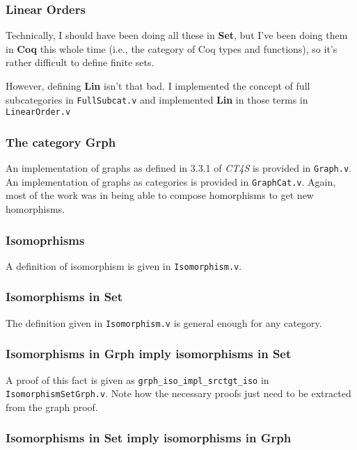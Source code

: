 \documentclass[12pt,twocolumn,oneside]{book}
\begin{document}
\subsubsection{Linear Orders}

Technically, I should have been doing all these in \textbf{Set}, but I've been
doing them in \textbf{Coq} this whole time (i.e., the category of Coq
types and functions), so it's rather difficult to define finite sets.

However, defining \textbf{Lin} isn't that bad. I implemented the concept of full
subcategories in \texttt{FullSubcat.v} and implemented \textbf{Lin} in those terms
in \texttt{LinearOrder.v}

\subsubsection{The category \textbf{Grph}}

An implementation of graphs as defined in 3.3.1 of \emph{CT4S} is provided in
\texttt{Graph.v}. An implementation of graphs as categories is provided in
\texttt{GraphCat.v}. Again, most of the work was in being able to compose homorphisms
to get new homorphisms.

\subsubsection{Isomoprhisms}

A definition of isomorphism is given in \texttt{Isomorphism.v}.

\subsubsection{Isomorphisms in \textbf{Set}}

The definition given in \texttt{Isomorphism.v} is general enough for any category.

\subsubsection{Isomorphisms in \textbf{Grph} imply isomorphisms in \textbf{Set}}

A proof of this fact is given as \texttt{grph\_iso\_impl\_srctgt\_iso} in \texttt{IsomorphismSetGrph.v}.
Note how the necessary proofs just need to be extracted from the graph proof.

\subsubsection{Isomorphisms in \textbf{Set} imply isomorphisms in \textbf{Grph}}
\end{document}
